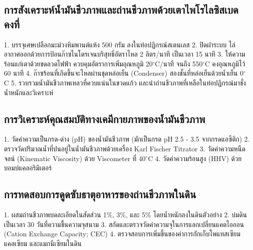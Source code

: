 \subsection{การสังเคราะห์น้ำมันชีวภาพและถ่านชีวภาพด้วยเตาไพโรไลซิสเบดคงที่}
\begin{conceptbox}
1. บรรจุเศษเปลือกมะม่วงหิมพานต์แห้ง 500 กรัม ลงในท่อปฏิกรณ์สเตนเลส
2. ปิดฝาระบบ ไล่อากาศออกด้วยการป้อนก๊าซไนโตรเจนบริสุทธิ์อัตราไหล 2 ลิตร/นาที เป็นเวลา 15 นาที
3. ให้ความร้อนแก่เตาด้วยขดลวดไฟฟ้า ควบคุมอัตราการเพิ่มอุณหภูมิ 20$^{\circ}$C/นาที จนถึง 550$^{\circ}$C คงอุณหภูมิไว้ 60 นาที
4. ก๊าซร้อนที่เกิดขึ้นจะไหลผ่านชุดหล่อเย็น (Condenser) สองชั้นที่หล่อเย็นด้วยน้ำเย็น 0$^{\circ}$C
5. รวบรวมน้ำมันชีวภาพเหลวที่ควบแน่นในขวดแก้ว และนำถ่านชีวภาพที่เหลือในท่อปฏิกรณ์มาชั่งน้ำหนักและวิเคราะห์
\end{conceptbox}

\subsection{การวิเคราะห์คุณสมบัติทางเคมีกายภาพของน้ำมันชีวภาพ}
\begin{conceptbox}
1. วัดค่าความเป็นกรด-ด่าง (pH) ของน้ำมันชีวภาพ (มักเป็นกรด pH 2.5 - 3.5 จากกรดแอซีติก)
2. ตรวจวัดปริมาณน้ำที่ปนอยู่ในน้ำมันชีวภาพด้วยเครื่อง Karl Fischer Titrator
3. วัดค่าความหนืดจลน์ (Kinematic Viscosity) ด้วย Viscometer ที่ 40$^{\circ}$C
4. วัดค่าความร้อนสูง (HHV) ด้วยบอมบ์แคลอริมิเตอร์
\end{conceptbox}

\subsection{การทดสอบการดูดซับธาตุอาหารของถ่านชีวภาพในดิน}
\begin{conceptbox}
1. ผสมถ่านชีวภาพบดละเอียดในสัดส่วน 1\%, 3\%, และ 5\% โดยน้ำหนักลงในดินตัวอย่าง
2. บ่มดินเป็นเวลา 30 วันที่ความชื้นความจุสนาม
3. สกัดและตรวจวัดค่าความจุในการแลกเปลี่ยนแคตไอออน (Cation Exchange Capacity; CEC)
4. ตรวจสอบการเพิ่มขึ้นของค่าการกักเก็บโพแทสเซียม แคลเซียม และแมกนีเซียมในดิน
\end{conceptbox}

